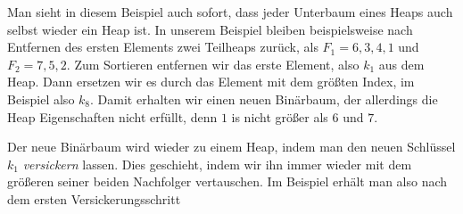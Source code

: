 \documentclass[tikz,12pt]{article}
\begin{document}
Man sieht in diesem Beispiel auch sofort, dass jeder Unterbaum eines Heaps auch selbst wieder ein Heap ist. 
In unserem Beispiel bleiben beispielsweise nach Entfernen des ersten Elements zwei Teilheaps zurück, als $F_1 = 6,3,4,1$ und $F_2 = 7,5,2$.
Zum Sortieren entfernen wir das erste Element, also $k_1$ aus dem Heap.
Dann ersetzen wir es durch das Element mit dem größten Index, im Beispiel also $k_8$. 
Damit erhalten wir einen neuen Binärbaum, der allerdings die Heap Eigenschaften nicht erfüllt, denn $1$ is nicht größer als $6$ und $7$. 
\begin{center}
\end{center}
Der neue Binärbaum wird wieder zu einem Heap, indem man den neuen Schlüssel $k_1$ \emph{versickern} lassen.
Dies geschieht, indem wir ihn immer wieder mit dem größeren seiner beiden Nachfolger vertauschen.
Im Beispiel erhält man also nach dem ersten Versickerungsschritt
\begin{center}
\end{center}
\end{document}
